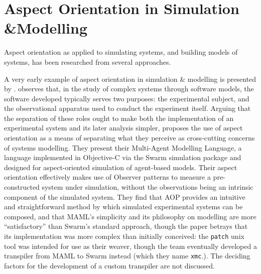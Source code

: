 




\section{Aspect Orientation in Simulation \&Modelling}\label{sec:ao_and_modelling}

Aspect orientation as applied to simulating systems, and building models of
systems, has been researched from several approaches.

A very early example of aspect orientation in simulation \& modelling
is presented by
\citet{gulyas1999use}. \citeauthor{gulyas1999use} observes that, in the study of
complex systems through software models, the software developed typically serves
two purposes: the experimental subject, and the observational apparatus used to
conduct the experiment itself. Arguing that the separation of these roles ought
to make both the implementation of an experimental system and its later analysis
simpler, \citeauthor{gulyas1999use} proposes the use of aspect orientation as a
means of separating what they perceive as cross-cutting concerns of systems
modelling. They present their Multi-Agent Modelling Language, a language
implemented in Objective-C via the Swarm simulation package and designed for
aspect-oriented simulation of agent-based models.%
Their aspect orientation effectively makes use of Observer patterns to measure a
pre-constructed system under simulation, without the observations being an
intrinsic component of the simulated system. They
find that AOP provides an intuitive and straightforward method by which
simulated experimental systems can be composed, and that MAML's simplicity and
its philosophy on modelling are more ``satisfactory'' than Swarm's standard
approach, though the paper betrays that its implementation was more complex than
initially conceived: the \lstinline{patch} unix tool was intended for use as
their weaver, though the team eventually developed a transpiler from MAML to
Swarm instead (which they name \lstinline{xmc}.). The deciding factors for the
development of a custom transpiler are not discussed.

